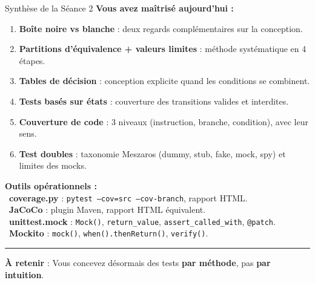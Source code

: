 \documentclass[aspectratio=169,11pt]{beamer}
\newcommand{\takeaway}[1]{%
\vfill\begin{beamercolorbox}[wd=\linewidth,sep=0.4em]{}
\color{accent2}\rule[0.6ex]{1.2em}{1.2pt}\hspace{0.4em}%
\textbf{\color{accent2}\small À retenir} \textcolor{textsoft}{:} %
{\small\color{textmain}#1}
\end{beamercolorbox}}
\newcommand{\oui}[1]{\textcolor{good}{\ding{51}}~#1}
\begin{document}
\begin{frame}[t]{Synthèse de la Séance 2}
\footnotesize
\textbf{Vous avez maîtrisé aujourd'hui :}\\[0.3em]
\begin{enumerate}\itemsep0.18em
\item \textbf{Boîte noire vs blanche} : deux regards complémentaires sur la conception.
\item \textbf{Partitions d'équivalence + valeurs limites} : méthode systématique en 4 étapes.
\item \textbf{Tables de décision} : conception explicite quand les conditions se combinent.
\item \textbf{Tests basés sur états} : couverture des transitions valides et interdites.
\item \textbf{Couverture de code} : 3 niveaux (instruction, branche, condition), avec leur sens.
\item \textbf{Test doubles} : taxonomie Meszaros (dummy, stub, fake, mock, spy) et limites des mocks.
\end{enumerate}
\vspace{0.4cm}
\textbf{Outils opérationnels :}\\[0.2em]
\oui{\textbf{coverage.py}} : \texttt{pytest --cov=src --cov-branch}, rapport HTML.\\
\oui{\textbf{JaCoCo}} : plugin Maven, rapport HTML équivalent.\\
\oui{\textbf{unittest.mock}} : \texttt{Mock()}, \texttt{return\_value}, \texttt{assert\_called\_with}, \texttt{@patch}.\\
\oui{\textbf{Mockito}} : \texttt{mock()}, \texttt{when().thenReturn()}, \texttt{verify()}.
\takeaway{Vous concevez désormais des tests \textbf{par méthode}, pas \textbf{par intuition}.}
\end{frame}
\end{document}
